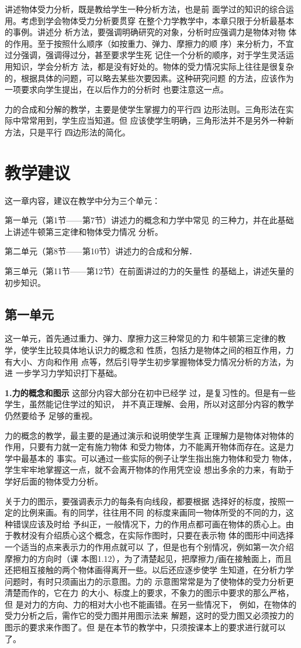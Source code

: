 讲述物体受力分析，既是教给学生一种分析方法，也是前
面学过的知识的综合运用。考虑到学会物体受力分析要贯穿
在整个力学教学中，本章只限于分析最基本的事例。讲述分
析方法，要强调明确研究的对象，分析时应强调力是物体对物
体的作用。至于按照什么顺序（如按重力、弹力、摩擦力的顺
序）来分析力，不宜过分强调，强调得过分，甚至要求学生死
记住一个分析的顺序，对于学生灵活运用知识，学会分析方
法，都是没有好处的。物体的受力情况实际上往往是很复杂
的，根据具体的问题，可以略去某些次要因素。这种研究问题
的方法，应该作为一项要求向学生提出，在以后作力的分析时
也要注意这一点。

力的合成和分解的教学，主要是使学生掌握力的平行四
边形法则。三角形法在实际中常常用到，学生应当知道。但
应该使学生明确，三角形法并不是另外一种新方法，只是平行
四边形法的简化。


\section{教学建议}
这一章内容，建议在教学中分为三个单元：

第一单元（第1节——第7节）讲述力的概念和力学中常见
的三种力，并在此基础上讲述牛顿第三定律和物体受力情况
分析。

第二单元（第8节——第10节）讲述力的合成和分解．

第三单元（第11节——第12节）在前面讲过的力的矢量性
的基础上，讲述矢量的初步知识。

\subsection{第一单元}
这一单元，首先通过重力、弹力、摩擦力这三种常见的力
和牛顿第三定律的教学，使学生比较具体地认识力的概念和
性质，包括力是物体之间的相互作用，力有大小、方向和作用
点等，然后引导学生初步掌握物体受力情况分析的方法，为进
一步学习力学知识打下基础。

\textbf{1.力的概念和图示}
\quad 
这部分内容大部分在初中已经学
过，是复习性的。但是有一些学生，虽然能记住学过的知识，
并不真正理解、会用，所以对这部分内容的教学仍然要给予
足够的重视。

力的概念的教学，最主要的是通过演示和说明使学生真
正理解力是物体对物体的作用，只要有力就一定有施力物体
和受力物体，力不能离开物体而存在。这是力学中最基本的
事实。可以通过一些实际的例子让学生指出施力物体和受力
物体，学生牢牢地掌握这一点，就不会离开物体的作用凭空设
想出多余的力来，有助于学好后面的物体受力分析。

关于力的图示，要强调表示力的每条有向线段，都要根据
选择好的标度，按照一定的比例来画。有的同学，往往用不同
的标度来画同一物体所受的不同的力，这种错误应该及时给
予纠正，一般情况下，力的作用点都可画在物体的质心上。由
于教材没有介绍质心这个概念，在实际作图时，只要在表示物
体的图形中间选择一个适当的点来表示力的作用点就可以
了，但是也有个别情况，例如第一次介绍摩擦力的方向时（课
本图1.12），为了清楚起见，把摩擦力$f$画在接触面上，而且
还把相互接触的两个物体画得离开一些。以后还应逐步使学
生知道，在分析力学问题时，有时只须画出力的示意图。力的
示意图常常是为了使物体的受力分析更清楚而作的，它在力
的大小、标度上的要求，不象力的图示中要求的那么严格，但
是对力的方向、力的相对大小也不能画错。在另一些情况下，
例如，在物体的受力分析之后，需作它的受力图并用图示法来
解题，这时的受力图又必须按力的图示的要求来作图了。但
是在本节的教学中，只须按课本上的要求进行就可以了。

